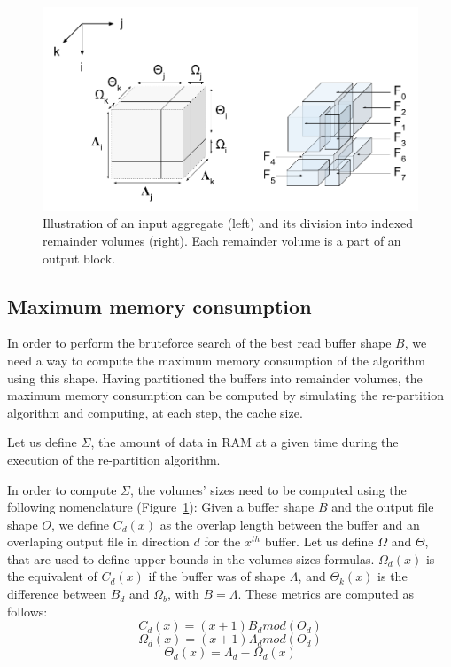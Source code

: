 \documentclass[sigconf, nonacm]{acmart}
\begin{document}
{\begin{figure}[h]
\centering
\includegraphics[scale=0.4]{./figures/new/figure_3.png}
\caption{Illustration of an input aggregate (left) and its division into indexed remainder volumes (right).
Each remainder volume is a part of an output block.}
\label{fig:nomenclature_overlaps}
\end{figure}

\subsection{Maximum memory consumption}
In order to perform the bruteforce search of the best read buffer shape $B$,
we need a way to compute the maximum memory consumption of the algorithm using
this shape.
Having partitioned the buffers into remainder volumes, the maximum memory
consumption can be computed by simulating the re-partition algorithm and
computing, at each step, the cache size.

Let us define $\Sigma$, the amount of data in RAM at a given time during the
execution of the re-partition algorithm.

In order to compute $\Sigma$, the volumes' sizes need to be computed using the
following nomenclature (Figure~\ref{fig:nomenclature_overlaps}):
Given a buffer shape $B$ and the output file shape $O$, we define $C_d(x)$ as
the overlap length between the buffer and an overlaping output file in direction
$d$ for the $x^{th}$ buffer. Let us define $\Omega$ and $\Theta$, that are used
to define upper bounds in the volumes sizes formulas. $\Omega_d(x)$ is the
equivalent of $C_d(x)$ if the buffer was of shape $\Lambda$, and $\Theta_k(x)$
is the difference between $B_d$ and $\Omega_b$, with $B=\Lambda$.
These metrics are computed as follows:
$$C_d(x) = (x+1)B_d mod(O_d)$$
$$\Omega_d(x) = (x+1)\Lambda_d mod(O_d)$$
$$\Theta_d(x) = \Lambda_d - \Omega_d(x)$$

}
\end{document}
